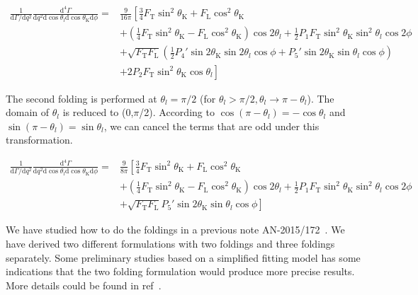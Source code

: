 \begin{equation} \label{eq:fold1}
    \begin{split}
        \frac{1}{\mathrm{d}\Gamma/\mathrm{d}q^2}\frac{\mathrm{d}^4\Gamma}{\mathrm{d}q^2 \mathrm{d}\cos\theta_l \mathrm{d}\cos\theta_\mathrm{K} \mathrm{d}\phi} =&\frac{9}{16\pi}\left[\frac{3}{4}F_\mathrm{T}\sin^2\theta_\mathrm{K} + F_\mathrm{L}\cos^2\theta_\mathrm{K} \right.\\
            &\left.+(\frac{1}{4}F_\mathrm{T}\sin^2\theta_\mathrm{K}-F_\mathrm{L}\cos^2\theta_\mathrm{K})\cos2\theta_l+\frac{1}{2}P_1F_\mathrm{T}\sin^2\theta_\mathrm{K}\sin^2\theta_l\cos 2\phi \right.\\
            &+\sqrt{F_\mathrm{T}F_\mathrm{L}}(\frac{1}{2}P_4'\sin2\theta_\mathrm{K}\sin2\theta_l\cos\phi+P_5'\sin2\theta_\mathrm{K}\sin\theta_l\cos\phi )\\
            &\left.+2P_2F_\mathrm{T}\sin^2\theta_\mathrm{K}\cos\theta_l \right]
    \end{split}
\end{equation}

The second folding is performed at $\theta_l = \pi/2$ (for
$\theta_l>\pi/2,\theta_l\rightarrow \pi- \theta_l$). The domain of
$\theta_l$ is reduced to (0,$\pi$/2). According to $\cos(\pi-\theta_l) = -
\cos\theta_l$ and $\sin(\pi-\theta_l) = \sin\theta_l$, we can cancel the terms that are odd under this transformation.


\begin{equation} \label{eq:fold2}
    \begin{split}
        \frac{1}{\mathrm{d}\Gamma/\mathrm{d}q^2}\frac{\mathrm{d}^4\Gamma}{\mathrm{d}q^2 \mathrm{d}\cos\theta_l \mathrm{d}\cos\theta_\mathrm{K} \mathrm{d}\phi} =&\frac{9}{8\pi}\left[\frac{3}{4}F_\mathrm{T}\sin^2\theta_\mathrm{K} + F_\mathrm{L}\cos^2\theta_\mathrm{K} \right.\\
            &\left.+(\frac{1}{4}F_\mathrm{T}\sin^2\theta_\mathrm{K}-F_\mathrm{L}\cos^2\theta_\mathrm{K})\cos2\theta_l+\frac{1}{2}P_1F_\mathrm{T}\sin^2\theta_\mathrm{K}\sin^2\theta_l\cos 2\phi \right.\\
            &\left.+\sqrt{F_\mathrm{T}F_\mathrm{L}}P_5'\sin2\theta_\mathrm{K}\sin\theta_l\cos\phi  \right]
    \end{split}
\end{equation}

We have studied how to do the foldings in a previous note
AN-2015/172~\cite{AN-15-172}. We have derived two different
formulations with two foldings and three foldings separately. Some
preliminary studies based on a simplified fitting model has some
indications that the two folding formulation would produce more
precise results.  More details could be found in ref~\cite{AN-15-172}.

